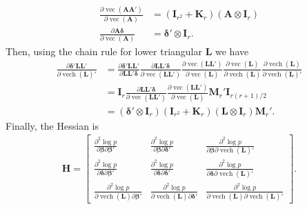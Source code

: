 \documentclass[12pt]{article}
\DeclareMathOperator{\vect}{vec}
\DeclareMathOperator{\vech}{vech}
\begin{document}
\begin{align*}
\frac{\partial \vect(\bm{A}\bm{A}')}{\partial \vect(\bm{A})} & = (\bm{I}_{r^2} + \bm{K}_r)(\bm{A}\otimes \bm{I}_r)\\
\frac{\partial \bm{A}\bm{\delta}}{\partial \vect(\bm{A})}& = \bm{\delta}' \otimes \bm{I}_r.
\end{align*}
Then, using the chain rule for lower triangular $\bm{L}$ we have
\begin{align*}
\frac{\partial \bm{\delta}'\bm{L}\bm{L'}}{\partial\vech(\bm{L})'} &= \frac{\partial \bm{\delta}'\bm{L}\bm{L'}}{\partial \bm{L}\bm{L}'\bm{\delta}} \frac{\partial \bm{L}\bm{L}'\bm{\delta}}{\partial \vect(\bm{L}\bm{L}')} \frac{\partial \vect(\bm{L}\bm{L}')}{\partial \vect(\bm{L})}\frac{\partial \vect(\bm{L})}{\partial \vech(\bm{L})}\frac{\partial \vech(\bm{L})}{\partial \vech(\bm{L})'}\\
&= \bm{I}_r \frac{\partial \bm{L}\bm{L}'\bm{\delta}}{\partial \vect(\bm{L}\bm{L}')} \frac{\partial \vect(\bm{L}\bm{L}')}{\partial \vect(\bm{L})} \bm{M}_r'\bm{I}_{r(r+1)/2}\\
&= (\bm{\delta}' \otimes \bm{I}_r)(\bm{I}_{r^2} + \bm{K}_r)(\bm{L}\otimes \bm{I}_r) \bm{M}_r'.
\end{align*}
Finally, the Hessian is
\begin{align*}
\bm{H} = \begin{bmatrix} \frac{\partial^2 \log p}{\partial \bm{\beta} \partial \bm{\beta}'} & \frac{\partial^2 \log p}{\partial \bm{\beta} \partial \bm{\delta} '} & \frac{\partial^2 \log p}{\partial \bm{\beta} \partial \vech(\bm{L}) '}\\
\frac{\partial^2 \log p}{\partial \bm{\delta} \partial \bm{\beta}'}  & \frac{\partial^2 \log p}{ \partial \bm{\delta} \partial \bm{\delta}'} & \frac{\partial^2 \log p}{ \partial \bm{\delta} \partial \vech(\bm{L})'}\\
\frac{\partial^2 \log p}{\partial \vech(\bm{L}) \partial \bm{\beta}'} & \frac{\partial^2 \log p}{ \partial \vech(\bm{L}) \partial \bm{\delta}'} & \frac{\partial^2 \log p}{\partial \vech(\bm{L}) \partial \vech(\bm{L})'} 
\end{bmatrix}.
\end{align*}
\end{document}
